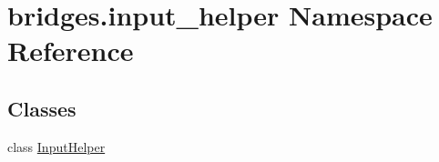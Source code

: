 \hypertarget{namespacebridges_1_1input__helper}{}\section{bridges.\+input\+\_\+helper Namespace Reference}
\label{namespacebridges_1_1input__helper}
\subsection*{Classes}
\begin{DoxyCompactItemize}
\item 
class \hyperlink{classbridges_1_1input__helper_1_1_input_helper}{Input\+Helper}
\end{DoxyCompactItemize}
